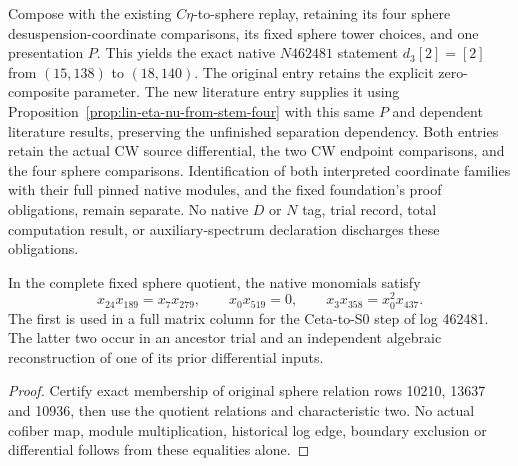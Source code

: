 \begin{proposition}
  Compose with the existing $C\eta$-to-sphere replay, retaining its four
  sphere desuspension-coordinate comparisons, its fixed sphere tower
  choices, and one presentation $P$. This yields the exact native
  $N462481$ statement $d_3[2]=[2]$ from $(15,138)$ to $(18,140)$.
  The original entry retains the explicit zero-composite parameter.
  The new literature entry supplies it using
  Proposition~\ref{prop:lin-eta-nu-from-stem-four} with this same $P$ and
  dependent literature results, preserving the unfinished separation
  dependency. Both entries retain the actual CW source differential,
  the two CW endpoint comparisons, and the four sphere comparisons. Identification of both interpreted
  coordinate families with their full pinned native modules, and the
  fixed foundation's proof obligations, remain separate.
  No native $D$ or $N$ tag, trial record, total computation result, or
  auxiliary-spectrum declaration discharges these obligations.
\end{proposition}

\begin{lemma}
  \label{lem:lin-high-stem-native-products}
  \leanok
  In the complete fixed sphere quotient, the native monomials satisfy
  \[
    x_{24}x_{189}=x_7x_{279},\qquad
    x_0x_{519}=0,\qquad
    x_3x_{358}=x_0^2x_{437}.
  \]
  The first is used in a full matrix column for the Ceta-to-S0 step of
  log 462481. The latter two occur in an ancestor trial and an independent
  algebraic reconstruction of one of its prior differential inputs.
\end{lemma}
\begin{proof}
  \leanok
  Certify exact membership of original sphere relation rows 10210,
  13637 and 10936, then use the quotient relations and characteristic two.
  No actual cofiber map, module multiplication, historical log edge,
  boundary exclusion or differential follows from these equalities alone.
\end{proof}

